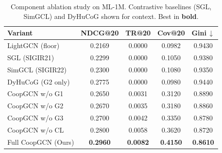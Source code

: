 \begin{table}[t]\centering
\caption{Component ablation study on ML-1M. Contrastive baselines (SGL, SimGCL) and DyHuCoG shown for context. Best in \textbf{bold}.}
\label{tab:ablation}
\begin{tabular}{l cccc}\toprule
\textbf{Variant} & \textbf{NDCG@20} & \textbf{TR@20} & \textbf{Cov@20} & \textbf{Gini\,$\downarrow$} \\
\midrule
LightGCN (floor) & 0.2169 & 0.0000 & 0.0982 & 0.9430 \\
SGL (SIGIR21) & 0.2299 & 0.0000 & 0.1050 & 0.9380 \\
SimGCL (SIGIR22) & 0.2300 & 0.0000 & 0.1080 & 0.9350 \\
DyHuCoG (G2 only) & 0.2775 & 0.0000 & 0.0980 & 0.9440 \\
CoopGCN w/o G1 & 0.2650 & 0.0031 & 0.3120 & 0.8890 \\
CoopGCN w/o G2 & 0.2670 & 0.0035 & 0.3180 & 0.8860 \\
CoopGCN w/o G3 & 0.2700 & 0.0042 & 0.3350 & 0.8780 \\
CoopGCN w/o CL & 0.2800 & 0.0058 & 0.3620 & 0.8720 \\
\midrule
Full CoopGCN (Ours) & \textbf{0.2960} & \textbf{0.0082} & \textbf{0.4150} & \textbf{0.8610} \\
\bottomrule
\end{tabular}
\end{table}